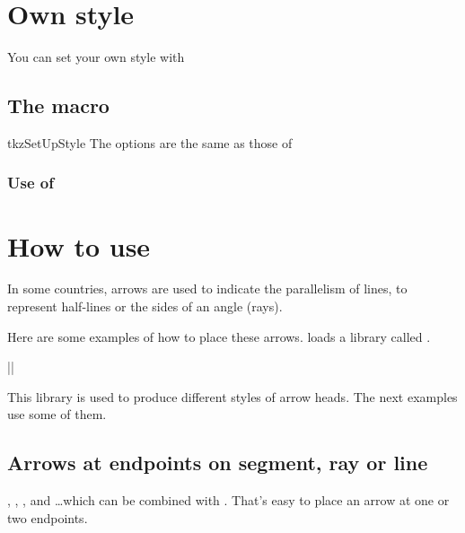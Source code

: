 \section{Own style}
You can set  your own style with 

\subsection{The macro  }
\begin{NewMacroBox}{tkzSetUpStyle}{}%
  The options are the same as those of \TIKZ
\end{NewMacroBox}

\subsubsection{Use of }
\begin{tkzexample}[latex=2cm,small]
\end{tkzexample}

\section{How to use }

In some countries, arrows are used to indicate the parallelism of lines,
to represent half-lines or the sides of an angle (rays).

Here are some examples of how to place these arrows.
 loads a library called .
 
|\usetikzlibrary{arrows.meta}|

This  library is used to produce different styles of arrow heads. The next examples use some of them. 

\subsection{Arrows at endpoints on segment, ray or line}
, , ,  and \dots  which can be combined with . That's easy to place an arrow at one or two endpoints.

